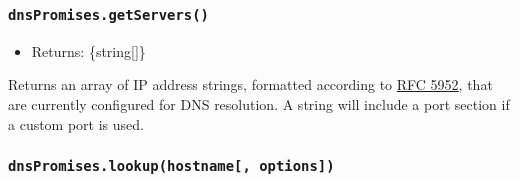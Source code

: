 \subsubsection{\texorpdfstring{\texttt{dnsPromises.getServers()}}{dnsPromises.getServers()}}\label{dnspromises.getservers}

\begin{itemize}
\tightlist
\item
  Returns: \{string{[}{]}\}
\end{itemize}

Returns an array of IP address strings, formatted according to
\href{https://tools.ietf.org/html/rfc5952\#section-6}{RFC 5952}, that
are currently configured for DNS resolution. A string will include a
port section if a custom port is used.

\begin{Shaded}
\begin{Highlighting}[]
\NormalTok{[}
  \OperatorTok{,}
  \OperatorTok{,}
  \OperatorTok{,}
  \StringTok{\textquotesingle{}[2001:4860:4860::8888]:1053\textquotesingle{}}\OperatorTok{,}
\NormalTok{]}
\end{Highlighting}
\end{Shaded}

\subsubsection{\texorpdfstring{\texttt{dnsPromises.lookup(hostname{[},\ options{]})}}{dnsPromises.lookup(hostname{[}, options{]})}}\label{dnspromises.lookuphostname-options}

